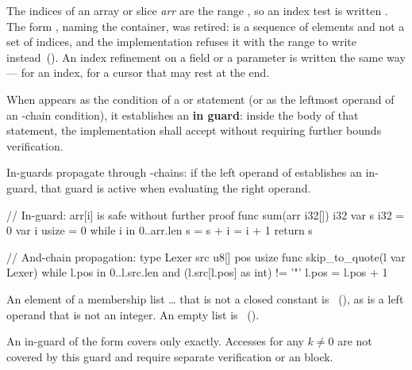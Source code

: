 \pnum
The indices of an array or slice \textit{arr} are the range , so an index test is
written .  The form , naming the container, was retired:
 is a sequence of elements and not a set of indices, and the implementation refuses it
with the range to write instead~().  An index refinement on a field or a parameter is
written the same way ---  for an index,  for a cursor that
may rest at the end.

\pnum
When  appears as the condition of a  or
 statement (or as the leftmost operand of an -chain
condition), it establishes an \textbf{in guard}: inside the body of that
statement, the implementation shall accept  without
requiring further bounds verification.

\pnum
In-guards propagate through -chains: if the left operand of
 establishes an in-guard, that guard is active when evaluating
the right operand.

\begin{example}
\begin{laincode}
// In-guard: arr[i] is safe without further proof
func sum(arr i32[]) i32 {
    var s i32 = 0
    var i usize = 0
    while i in 0..arr.len {
        s = s +%
        i = i + 1
    }
    return s
}

// And-chain propagation:
type Lexer {
    src u8[]
    pos usize
}
func skip_to_quote(l var Lexer) {
    while l.pos in 0..l.src.len and (l.src[l.pos] as int) != '"' {
        l.pos = l.pos + 1
    }
}
\end{laincode}
\end{example}

\begin{constraint}
  An element of a membership list \lain{x in [}\ldots\lain{]} that is not a closed constant is
  \illformed{}~(), as is a left operand that is not an integer.  An empty list is
  \illformed{}~().
\end{constraint}

\begin{constraint}
  An in-guard of the form  covers only 
  exactly.  Accesses  for any $k \neq 0$ are not
  covered by this guard and require separate verification or an
   block.
\end{constraint}

